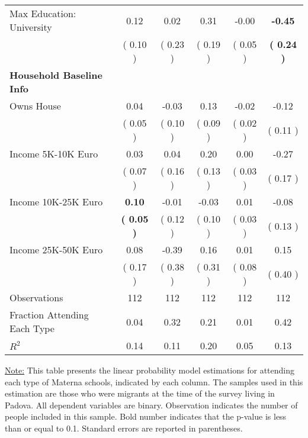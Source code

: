 \begin{table}[H]
{\begin{tabular}{lccccc}
\quad Max Education: University &      0.12 &      0.02 &      0.31 &     -0.00 & \textbf{    -0.45} \\
\quad  & (     0.10 ) & (     0.23 )  & (     0.19 )  & (     0.05 ) & \textbf{(     0.24 )} \\
\midrule
\textbf{Household Baseline Info} \\
\quad Owns House &      0.04 &     -0.03 &      0.13 &     -0.02 &     -0.12 \\
\quad  & (     0.05 ) & (     0.10 )  & (     0.09 )  & (     0.02 ) & (     0.11 ) \\
\quad Income 5K-10K Euro &      0.03 &      0.04 &      0.20 &      0.00 &     -0.27 \\
\quad  & (     0.07 ) & (     0.16 )  & (     0.13 )  & (     0.03 ) & (     0.17 ) \\
\quad Income 10K-25K Euro & \textbf{     0.10} &     -0.01 &     -0.03 &      0.01 &     -0.08 \\
\quad  & \textbf{(     0.05 )} & (     0.12 )  & (     0.10 )  & (     0.03 ) & (     0.13 ) \\
\quad Income 25K-50K Euro &      0.08 &     -0.39 &      0.16 &      0.01 &      0.15 \\
\quad  & (     0.17 ) & (     0.38 )  & (     0.31 )  & (     0.08 ) & (     0.40 ) \\
\midrule
Observations & 112 & 112 & 112 & 112 & 112 \\
Fraction Attending Each Type &      0.04 &      0.32 &      0.21 &      0.01 &      0.42 \\
\midrule
$ R^2$ &      0.14 &      0.11 &      0.20 &      0.05 &      0.13 \\
\bottomrule
\end{tabular}}
\end{table}
\begin{scriptsize}
\noindent\underline{Note:} This table presents the linear probability model estimations for attending each type of Materna schools, indicated by each column. The samples used in this estimation are those who were migrants at the time of the survey living in Padova. All dependent variables are binary. Observation indicates the number of people included in this sample. Bold number indicates that the p-value is less than or equal to 0.1. Standard errors are reported in parentheses.
\end{scriptsize}
